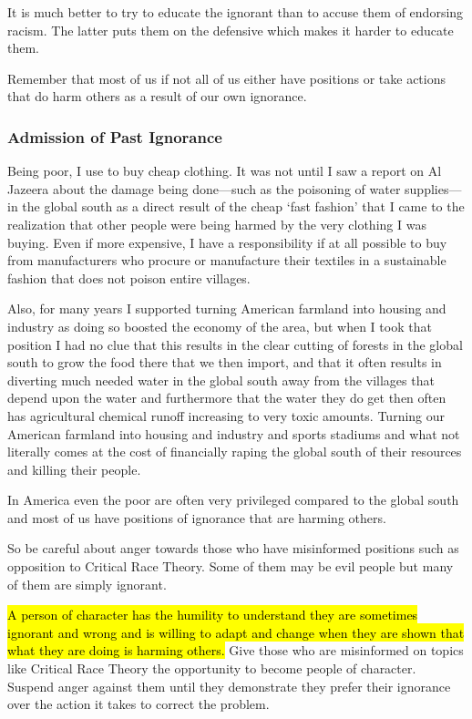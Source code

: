 It is much better to try to educate the ignorant than to accuse them of endorsing racism. The latter puts them on the defensive which makes it harder to educate them.

Remember that most of us if not all of us either have positions or take actions that do harm others as a result of our own ignorance.

\subsubsection{Admission of Past Ignorance}

Being poor, I use to buy cheap clothing. It was not until I saw a report on Al Jazeera about the damage being done---such as the poisoning of water supplies---in the global south as a direct result of the cheap `fast fashion' that I came to the realization that other people were being harmed by the very clothing I was buying. Even if more expensive, I have a responsibility if at all possible to buy from manufacturers who procure or manufacture their textiles in a sustainable fashion that does not poison entire villages.

Also, for many years I supported turning American farmland into housing and industry as doing so boosted the economy of the area, but when I took that position I had no clue that this results in the clear cutting of forests in the global south to grow the food there that we then import, and that it often results in diverting much needed water in the global south away from the villages that depend upon the water and furthermore that the water they do get then often has agricultural chemical runoff increasing to very toxic amounts. Turning our American farmland into housing and industry and sports stadiums and what not literally comes at the cost of financially raping the global south of their resources and killing their people.

In America even the poor are often very privileged compared to the global south and most of us have positions of ignorance that are harming others.

So be careful about anger towards those who have misinformed positions such as opposition to Critical Race Theory. Some of them may be evil people but many of them are simply ignorant.

\hl{A person of character has the humility to understand they are sometimes ignorant and wrong and is willing to adapt and change when they are shown that what they are doing is harming others.} Give those who are misinformed on topics like Critical Race Theory the opportunity to become people of character. Suspend anger against them until they demonstrate they prefer their ignorance over the action it takes to correct the problem.
